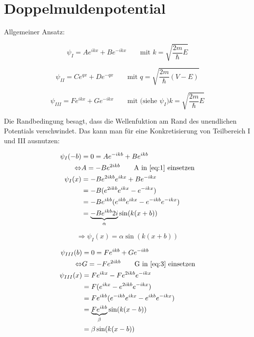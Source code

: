 



\setcounter{section}{1}
\section*{Doppelmuldenpotential}

Allgemeiner Ansatz:

\begin{equation}
  \label{eq:1}
  \psi_I = Ae^{ikx}+Be^{-ikx} \qquad \text{mit } k = \sqrt{\frac{2m}{\hbar}E}
\end{equation}

\begin{equation}
  \label{eq:2}
  \psi_{II} = Ce^{q x}+De^{-qx}\qquad \text{mit } q = \sqrt{\frac{2m}{\hbar}(V-E)}
\end{equation}

\begin{equation}
  \label{eq:3}
  \psi_{III} = Fe^{ikx}+Ge^{-ikx}\qquad \text{mit (siehe }\psi_{I}) k = \sqrt{\frac{2m}{\hbar}E}
\end{equation}


Die Randbedingung besagt, dass die Wellenfuktion am Rand des unendlichen  Potentials verschwindet. Das kann man für eine Konkretisierung von Teilbereich I und III ausnutzen:

\begin{align}
  \label{eq:4}
  \psi_{I}(-b) &= 0 = Ae^{-ikb}+Be^{ikb} \\
\Leftrightarrow & A = -Be^{2ikb}\qquad\text{A in }\ref{eq:1}\text{ einsetzen}\\
\psi_I(x)&=-Be^{2ikb}e^{ikx}+Be^{-ikx} \\
&=-B(e^{2ikb}e^{ikx}-e^{-ikx})\\
&=-B e^{ikb}(e^{ikb}e^{ikx}-e^{-ikb}e^{-ikx})\\
&=\underbrace{-B e^{ikb}2i}_{\alpha}\sin(k(x+b))
\end{align}

\begin{equation}
  \label{eq:5}
  \Rightarrow \psi_I(x)=\alpha\sin(k(x+b))
\end{equation}

\begin{align}
  \label{eq:6}
  \psi_{III}(b) &= 0 = Fe^{ikb}+Ge^{-ikb} \\
\Leftrightarrow & G = -Fe^{2ikb}\qquad\text{G in }\ref{eq:3}\text{ einsetzen}\\
\psi_{III}(x)&=Fe^{ikx} -Fe^{2ikb} e^{-ikx} \\
&=F(e^{ikx}-e^{2ikb}e^{-ikx})\\
&=Fe^{ikb}(e^{-ikb}e^{ikx}-e^{ikb}e^{-ikx})\\
&=\underbrace{Fe^{ikb} }_{\beta}\sin(k(x-b))\\
&=\beta\sin(k(x-b))
\end{align}

